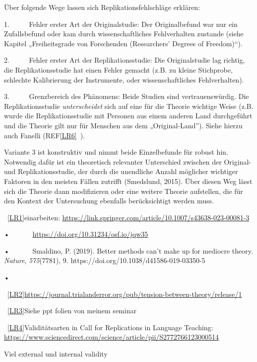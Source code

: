 \documentclass[
  letterpaper,
  DIV=11,
  numbers=noendperiod]{scrreprt}
\begin{document}
Über folgende Wege lassen sich Replikationsfehlschläge erklären:

1.~~~~~ Fehler erster Art der Originalstudie: Der Originalbefund war nur
ein Zufallsbefund oder kam durch wissenschaftliches Fehlverhalten
zustande (siehe Kapitel „Freiheitsgrade von Forschenden (Researchers'
Degrees of Freedom)``).

2.~~~~~ Fehler erster Art der Replikationsstudie: Die Originalstudie lag
richtig, die Replikationsstudie hat einen Fehler gemacht (z.B. zu kleine
Stichprobe, schlechte Kalibrierung der Instrumente, oder
wissenschaftliches Fehlverhalten).

3.~~~~~ Grenzbereich des Phänomens: Beide Studien sind vertrauenswürdig.
Die Replikationsstudie \emph{unterscheidet} sich auf eine für die
Theorie wichtige Weise (z.B. wurde die Replikationsstudie mit Personen
aus einem anderen Land durchgeführt und die Theorie gilt nur für
Menschen aus dem „Original-Land''). Siehe hierzu auch Fanelli
(REF\hyperref[_msocom_6]{{[}LR6{]}}~).

Variante 3 ist konstruktiv und nimmt beide Einzelbefunde für robust hin.
Notwendig dafür ist ein theoretisch relevanter Unterschied zwischen der
Original- und Replikationsstudie, der durch die unendliche Anzahl
möglicher wichtiger Faktoren in den meisten Fällen zutrifft (Smedslund,
2015). Über diesen Weg lässt sich die Theorie dann modifizieren oder
eine weitere Theorie aufstellen, die für den Kontext der Untersuchung
ebenfalls berücksichtigt werden muss.

~\hyperref[_msoanchor_1]{{[}LR1{]}}einarbeiten:
\url{https://link.springer.com/article/10.1007/s43638-023-00081-3}

•~~~~~~ \url{https://doi.org/10.31234/osf.io/jqw35}

•~~~~~~ Smaldino, P. (2019). Better methods can't make up for mediocre
theory. \emph{Nature}, \emph{575}(7781), 9.
https://doi.org/10.1038/d41586-019-03350-5

•~~~~~~ ~

~\hyperref[_msoanchor_2]{{[}LR2{]}}\url{https://journal.trialanderror.org/pub/tension-between-theory/release/1}

~\hyperref[_msoanchor_3]{{[}LR3{]}}Siehe ppt folien von meinem seminar

~\hyperref[_msoanchor_4]{{[}LR4{]}}Validitätsarten in Call for
Replications in Language Teaching:
\url{https://www.sciencedirect.com/science/article/pii/S2772766123000514}

Viel external und internal validity
\end{document}
